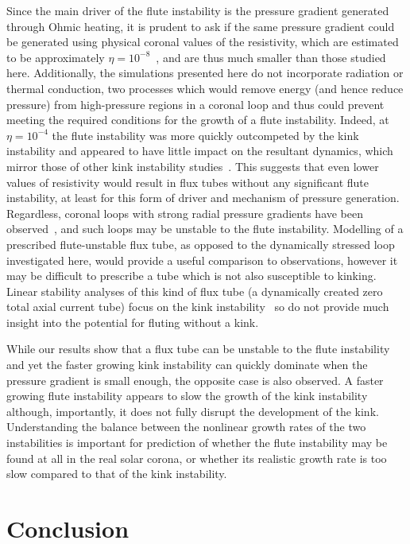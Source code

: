 \documentclass[fleqn,usenatbib]{mnras}
\begin{document}
Since the main driver of the flute instability is the pressure gradient
generated through Ohmic heating, it is prudent to ask if the same pressure
gradient could be generated using physical coronal values of the resistivity,
which are estimated to be approximately
$\eta=10^{-8}$~\citep{craigAnisotropicViscousDissipation2009a}, and are thus
much smaller than those studied here. Additionally, the simulations presented
here do not incorporate radiation or thermal conduction, two processes which
would remove energy (and hence reduce pressure) from high-pressure regions in
a coronal loop and thus could prevent meeting the required conditions for the
growth of a flute instability. Indeed, at $\eta=10^{-4}$ the flute instability
was more quickly outcompeted by the kink instability and appeared to have
little impact on the resultant dynamics, which mirror those of other kink
instability studies~\citep{hoodCoronalHeatingMagnetic2009}. This suggests
that even lower values of resistivity would result in flux tubes without any
significant flute instability, at least for this form of driver and mechanism
of pressure generation. Regardless, coronal loops with strong radial pressure
gradients have been observed~\citep{foukalTemperatureStructurePressure1975},
and such loops may be unstable to the flute instability. Modelling of
a prescribed flute-unstable flux tube, as opposed to the dynamically stressed
loop investigated here, would provide a useful comparison to observations,
however it may be difficult to prescribe a tube which is not also susceptible
to kinking. Linear stability analyses of this kind of flux tube (a dynamically
created zero total axial current tube) focus on the kink
instability~\citep{browningSolarCoronalHeating2003b} so do not provide much
insight into the potential for fluting without a kink. 

While our results show that a flux tube can be unstable to the flute
instability and yet the faster growing kink instability can quickly dominate
when the pressure gradient is small enough, the opposite case is also observed.
A faster growing flute instability appears to slow the growth of the kink
instability although, importantly, it does not fully disrupt the development of
the kink. Understanding the balance between the nonlinear growth rates of the
two instabilities is important for prediction of whether the flute instability
may be found at all in the real solar corona, or whether its realistic growth
rate is too slow compared to that of the kink instability. 

\section{Conclusion}
\label{sec-conclusions}
\end{document}
